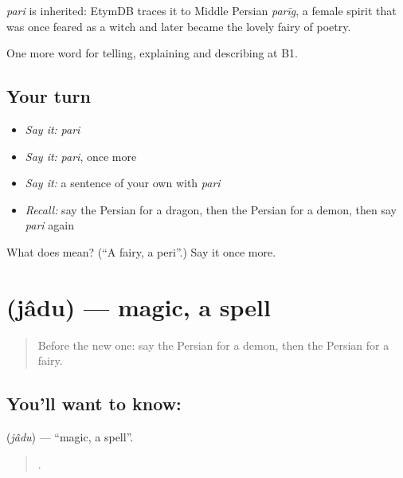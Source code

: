 \begin{cousinweb}
\emph{pari} is inherited: EtymDB traces it to Middle Persian \emph{parīg}, a female spirit that was once feared as a witch and later became the lovely fairy of poetry.
\end{cousinweb}

\begin{grammarlens}[title={What you've built}]
One more word for telling, explaining and describing at B1.
\end{grammarlens}

\subsection*{Your turn}
\begin{itemize}
\raggedright
  \item \emph{Say it:} \emph{pari}
  \item \emph{Say it:} \emph{pari}, once more
  \item \emph{Say it:} a sentence of your own with \emph{pari}
  \item \emph{Recall:} say the Persian for a dragon, then the Persian for a demon, then say \emph{pari} again
\end{itemize}

\begin{tcolorbox}[breakable,colback=teal!4,colframe=teal!35!black,title={Before you move on}]
What does  mean? (\textquotedblleft{}A fairy, a peri\textquotedblright{}.) Say it once more.
\end{tcolorbox}
\section[\texorpdfstring{\fa{جادو} (jâdu)}{جادو (jâdu)}]{ (jâdu) — magic, a spell}

\label{lesson:FA-C348-jadu}



\begin{quote}
Before the new one: say the Persian for a demon, then the Persian for a fairy.
\end{quote}

\subsection*{You'll want to know: }
\textbf{} (\emph{jâdu}) — \textquotedblleft{}magic, a spell\textquotedblright{}.

\begin{quote}
    .
\end{quote}

